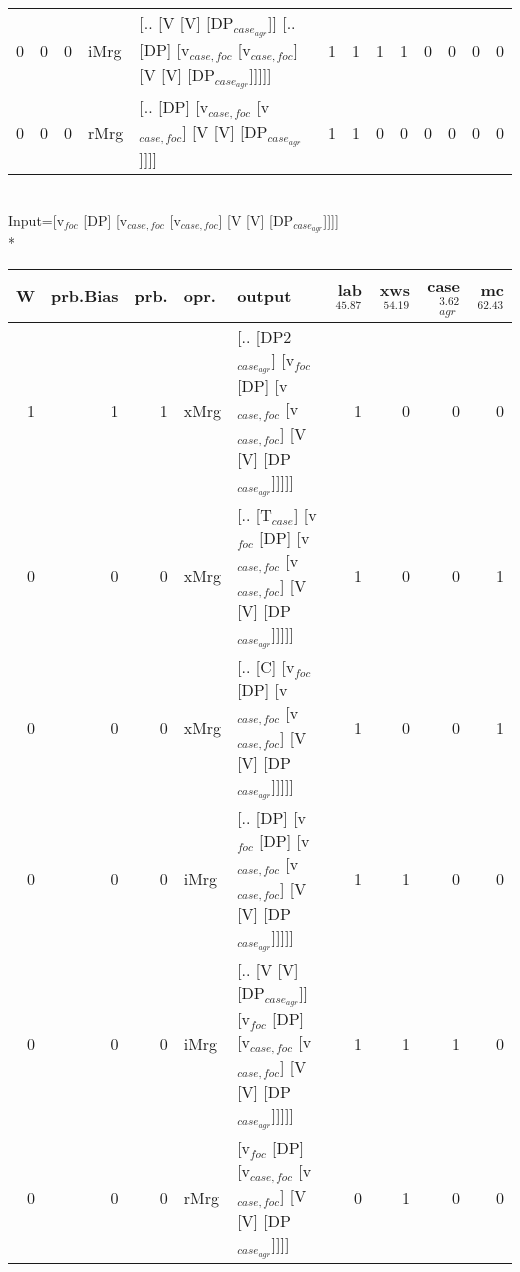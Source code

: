\begin{tabularx}{\linewidth}{rrrlXrrrrrrrr}
   0 &       0 &   0 & iMrg & [.. [V [V] [DP$_{case_{agr}}$]] [.. [DP] [v$_{case,foc}$ [v$_{case,foc}$] [V [V] [DP$_{case_{agr}}$]]]]]                           &             1 &             1 &                  1 &            1 &              0 &                0 &              0 &          0 \\
   0 &       0 &   0 & rMrg & [.. [DP] [v$_{case,foc}$ [v$_{case,foc}$] [V [V] [DP$_{case_{agr}}$]]]]                                                      &             1 &             1 &                  0 &            0 &              0 &                0 &              0 &          0 \\
\hline
\end{tabularx}\endgroup\\
\begingroup\scriptsize Input=[v$_{foc}$ [DP] [v$_{case,foc}$ [v$_{case,foc}$] [V [V] [DP$_{case_{agr}}$]]]]\\*
\begin{tabularx}{\linewidth}{rrrlXrrrr}
\hline
   W &   prb.Bias &   prb. & opr.   & output                                                                                  &   lab$^{45.87}$ &   xws$^{54.19}$ &   case$_{agr}^{3.62}$ &   mc$^{62.43}$ \\
\hline
   1 &       1 &   1 & xMrg & [.. [DP2$_{case_{agr}}$] [v$_{foc}$ [DP] [v$_{case,foc}$ [v$_{case,foc}$] [V [V] [DP$_{case_{agr}}$]]]]]        &             1 &             0 &                  0 &            0 \\
   0 &       0 &   0 & xMrg & [.. [T$_{case}$] [v$_{foc}$ [DP] [v$_{case,foc}$ [v$_{case,foc}$] [V [V] [DP$_{case_{agr}}$]]]]]              &             1 &             0 &                  0 &            1 \\
   0 &       0 &   0 & xMrg & [.. [C] [v$_{foc}$ [DP] [v$_{case,foc}$ [v$_{case,foc}$] [V [V] [DP$_{case_{agr}}$]]]]]                   &             1 &             0 &                  0 &            1 \\
   0 &       0 &   0 & iMrg & [.. [DP] [v$_{foc}$ [DP] [v$_{case,foc}$ [v$_{case,foc}$] [V [V] [DP$_{case_{agr}}$]]]]]                  &             1 &             1 &                  0 &            0 \\
   0 &       0 &   0 & iMrg & [.. [V [V] [DP$_{case_{agr}}$]] [v$_{foc}$ [DP] [v$_{case,foc}$ [v$_{case,foc}$] [V [V] [DP$_{case_{agr}}$]]]]] &             1 &             1 &                  1 &            0 \\
   0 &       0 &   0 & rMrg & [v$_{foc}$ [DP] [v$_{case,foc}$ [v$_{case,foc}$] [V [V] [DP$_{case_{agr}}$]]]]                            &             0 &             1 &                  0 &            0 \\
\hline
\end{tabularx}\endgroup\\
